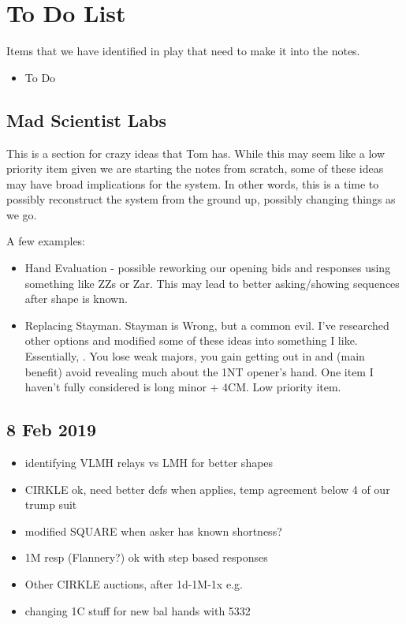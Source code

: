 \documentclass[tom-ari]{subfile}
\begin{document}
	
	\chapter{To Do List}
	
	Items that we have identified in play that need to make it into the notes.
	\begin{itemize}
		\item To Do
	\end{itemize}

	\section{Mad Scientist Labs}
	
	This is a section for crazy ideas that Tom has.  While this may seem like a low priority item given we are starting the notes from scratch, some of these ideas may have broad implications for the system.  In other words, this is a time to possibly reconstruct the system from the ground up, possibly changing things as we go.
	
	A few examples:
	
	\begin{itemize}
		\item Hand Evaluation - possible reworking our opening bids and responses using something like ZZs or Zar.  This may lead to better asking/showing sequences after shape is known.
		\item Replacing Stayman.  Stayman is Wrong, but a common evil.  I've researched other options and modified some of these ideas into something I like.  Essentially, \rightarrow{}.  You lose weak majors, you gain getting out in  and (main benefit) avoid revealing much about the 1NT opener's hand.  One item I haven't fully considered is long minor + 4CM.  Low priority item.
	\end{itemize}

	\section{8 Feb 2019}
	\begin{itemize}
		\item identifying VLMH relays vs LMH for better shapes
		\item CIRKLE ok, need better defs when applies, temp agreement below 4 of our trump suit
		\item modified SQUARE when asker has known shortness?
		\item 1M resp (Flannery?) ok with step based responses 
		\item Other CIRKLE auctions, after 1d-1M-1x e.g.
		\item changing 1C stuff for new bal hands with 5332
	\end{itemize}
\end{document}
